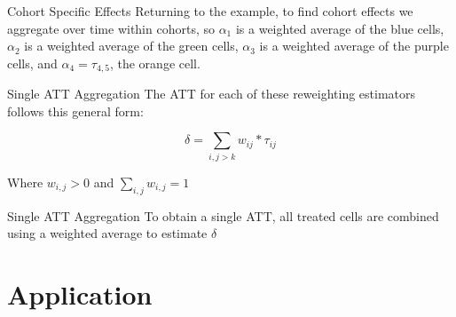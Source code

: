 \documentclass[11pt]{beamer}
\begin{document}
\begin{frame}{Cohort Specific Effects}
    Returning to the example, to find cohort effects we aggregate over time within cohorts, so $\alpha_1$ is a weighted average of the blue cells, $\alpha_2$ is a weighted average of the green cells, $\alpha_3$ is a weighted average of the purple cells, and $\alpha_4 = \tau_{4,5}$, the orange cell.
    
\end{frame}

\begin{frame}{Single ATT Aggregation}
    The ATT for each of these reweighting estimators follows this general form:

    \begin{equation}\label{eq:delta}
        \delta = \sum_{i,j>k} w_{ij} * \tau_{ij}
    \end{equation}

    Where $w_{i,j} > 0$ and $\sum_{i,j} w_{i,j} = 1$
\end{frame}

\begin{frame}{Single ATT Aggregation}
    To obtain a single ATT, all treated cells are combined using a weighted average to estimate $\delta$

    
\end{frame}


\section{Application}
\end{document}
